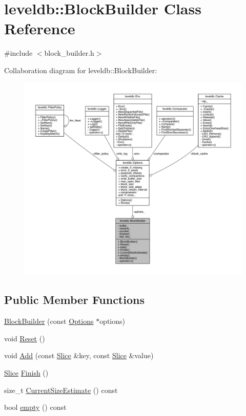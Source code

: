 \hypertarget{classleveldb_1_1_block_builder}{}\section{leveldb\+:\+:Block\+Builder Class Reference}
\label{classleveldb_1_1_block_builder}


{\ttfamily \#include $<$block\+\_\+builder.\+h$>$}



Collaboration diagram for leveldb\+:\+:Block\+Builder\+:
\nopagebreak
\begin{figure}[H]
\begin{center}
\leavevmode
\includegraphics[width=350pt]{classleveldb_1_1_block_builder__coll__graph}
\end{center}
\end{figure}
\subsection*{Public Member Functions}
\begin{DoxyCompactItemize}
\item 
\hyperlink{classleveldb_1_1_block_builder_a697ffa03ff6e8f5dec0558c05136f89c}{Block\+Builder} (const \hyperlink{structleveldb_1_1_options}{Options} $\ast$options)
\item 
void \hyperlink{classleveldb_1_1_block_builder_a812168608c24de2dfa1651fcdd88e49b}{Reset} ()
\item 
void \hyperlink{classleveldb_1_1_block_builder_a17d0e23f1e7afcb874b22a0cb0b6cf17}{Add} (const \hyperlink{classleveldb_1_1_slice}{Slice} \&key, const \hyperlink{classleveldb_1_1_slice}{Slice} \&value)
\item 
\hyperlink{classleveldb_1_1_slice}{Slice} \hyperlink{classleveldb_1_1_block_builder_ab345ab44def13fb180502e9637b28bcd}{Finish} ()
\item 
size\+\_\+t \hyperlink{classleveldb_1_1_block_builder_a836fd5dfd46b72d2438a7d59a984a72f}{Current\+Size\+Estimate} () const 
\item 
bool \hyperlink{classleveldb_1_1_block_builder_ae8d2223984da12b810124688aa56fdcd}{empty} () const 
\end{DoxyCompactItemize}
